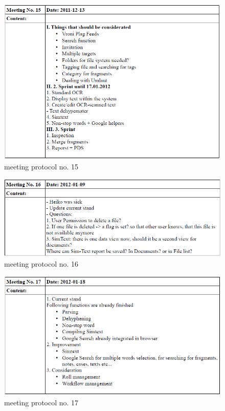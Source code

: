 \begin{appendix}
\begin{figure}[htbp]
  \centering
    \includegraphics[width=\textwidth]{images/a_meetings/meeting_15.png}
  \caption{meeting protocol no. 15}
  \label{fig:meeting protocol no. 15}
\end{figure}

\begin{figure}[htbp]
  \centering
    \includegraphics[width=\textwidth]{images/a_meetings/meeting_16.png}
  \caption{meeting protocol no. 16}
  \label{fig:meeting protocol no. 16}
\end{figure}

\begin{figure}[htbp]
  \centering
    \includegraphics[width=\textwidth]{images/a_meetings/meeting_17.png}
  \caption{meeting protocol no. 17}
  \label{fig:meeting protocol no. 17}
\end{figure}


\end{appendix}
